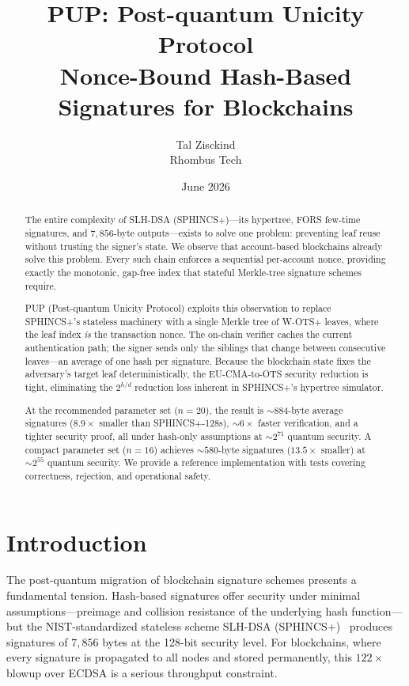 \documentclass[11pt]{article}
\title{PUP: Post-quantum Unicity Protocol\\[6pt]
\large Nonce-Bound Hash-Based Signatures for Blockchains}
\author{Tal Zisckind\\[4pt]\normalsize Rhombus Tech}
\date{June 2026}
\begin{document}
\maketitle

\begin{abstract}
The entire complexity of SLH-DSA (SPHINCS+)---its hypertree, FORS
few-time signatures, and $7{,}856$-byte outputs---exists to solve one
problem: preventing leaf reuse without trusting the signer's state.
We observe that account-based blockchains already solve this problem.
Every such chain enforces a sequential per-account nonce, providing
exactly the monotonic, gap-free index that stateful Merkle-tree
signature schemes require.

PUP (Post-quantum Unicity Protocol) exploits this
observation to replace SPHINCS+'s stateless machinery with a single
Merkle tree of W-OTS+ leaves, where the leaf index \emph{is} the
transaction nonce. The on-chain verifier caches the current
authentication path; the signer sends only the siblings that change
between consecutive leaves---an average of one hash per signature.
Because the blockchain state fixes the adversary's target leaf
deterministically, the EU-CMA-to-OTS security reduction is tight,
eliminating the $2^{h/d}$ reduction loss inherent in SPHINCS+'s
hypertree simulator.

At the recommended parameter set ($n = 20$), the result is
${\sim}884$-byte average signatures ($8.9\times$ smaller than
SPHINCS+-128s), ${\sim}6\times$ faster verification, and a tighter
security proof, all under hash-only assumptions at ${\sim}2^{71}$
quantum security. A compact parameter set ($n = 16$) achieves
${\sim}580$-byte signatures ($13.5\times$ smaller) at ${\sim}2^{55}$
quantum security. We provide a reference implementation with tests
covering correctness, rejection, and operational safety.
\end{abstract}

\section{Introduction}

The post-quantum migration of blockchain signature schemes presents a
fundamental tension. Hash-based signatures offer security under minimal
assumptions---preimage and collision resistance of the underlying hash
function---but the NIST-standardized stateless scheme SLH-DSA
(SPHINCS+)~\cite{sphincs} produces signatures of $7{,}856$ bytes at the
128-bit security level. For blockchains, where every signature is
propagated to all nodes and stored permanently, this $122\times$ blowup
over ECDSA is a serious throughput constraint.
\end{document}
